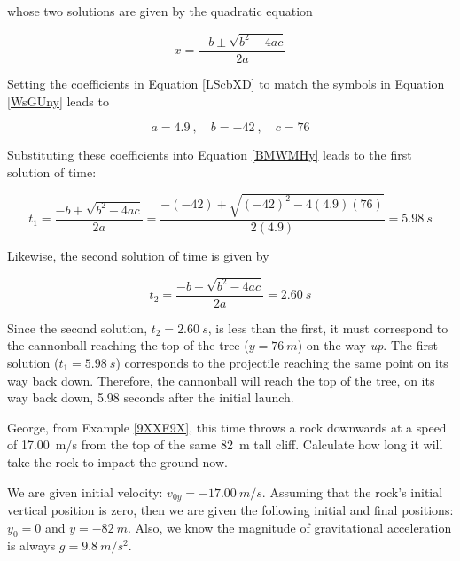 \documentclass[dvipsnames]{article}
\numberwithin{equation}{section}
\numberwithin{figure}{section}
\begin{document}
whose two solutions are given by the quadratic equation

\begin{equation} \label{BMWMHy}
    x = \frac{-b \pm \sqrt{b^2 - 4ac}}{2a}
\end{equation}

Setting the coefficients in Equation \eqref{LScbXD} to match the symbols in Equation \eqref{WsGUny} leads to 

\begin{equation*}
    a = 4.9\ , \quad b = -42\ ,\quad c = 76
\end{equation*}

Substituting these coefficients into Equation \eqref{BMWMHy} leads to the first solution of time:

\begin{equation*}
    t_1 = \frac{-b + \sqrt{b^2 - 4ac}}{2a} = \frac{-(-42) + \sqrt{(-42)^2 - 4 (4.9)(76)}}{2(4.9)} = \SI{5.98}{s}
\end{equation*}

Likewise, the second solution of time is given by

\begin{equation*}
    t_2 = \frac{-b - \sqrt{b^2 - 4ac}}{2a} = \SI{2.60}{s}
\end{equation*}

Since the second solution, $t_2 = \SI{2.60}{s}$, is less than the first, it must correspond to the cannonball reaching the top of the tree ($y=\SI{76}{m}$) on the way \textit{up}. The first solution ($t_1 = \SI{5.98}{s}$) corresponds to the projectile reaching the same point on its way back down. Therefore, the cannonball will reach the top of the tree, on its way back down, 5.98 seconds after the initial launch.

\solutionEnd


\begin{example} \label{pyn6Go}
    George, from Example \ref{9XXF9X}, this time throws a rock downwards at a speed of \SI{17.00}{m/s} from the top of the same \SI{82}{m} tall cliff. Calculate how long it will take the rock to impact the ground now.
\end{example}

\Solution We are given initial velocity: $v_{0y} = \SI{-17.00}{m/s}$. Assuming that the rock's initial vertical position is zero, then we are given the following initial and final positions: $y_0 = 0$ and $y = \SI{-82}{m}$. Also, we know the magnitude of gravitational acceleration is always $g = \SI{9.8}{m/s^2}$. 
\end{document}
